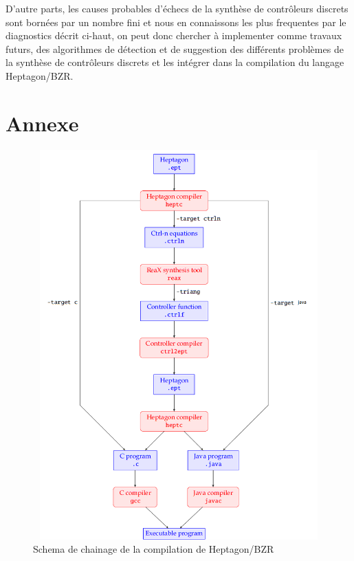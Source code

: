 \documentclass{svjour3}
\begin{document}
D'autre parts, les causes probables d'échecs de la synthèse de contrôleurs discrets sont bornées par un nombre fini et nous en connaissons les plus frequentes par 
le diagnostics décrit ci-haut, on peut donc chercher à implementer comme travaux futurs, des algorithmes de détection et de suggestion des différents problèmes de la 
synthèse de contrôleurs discrets et les intégrer dans la compilation du langage Heptagon/BZR.

\begin{acknowledgements}
\end{acknowledgements}
\newpage
\newpage
\section{Annexe}
\begin{figure}[!h]
 \includegraphics[height=15cm, width=15cm]{compilation.png}
 \caption{Schema de chainage de la compilation de Heptagon/BZR}
 \label{schemaCompile}
\end{figure}
\end{document}
